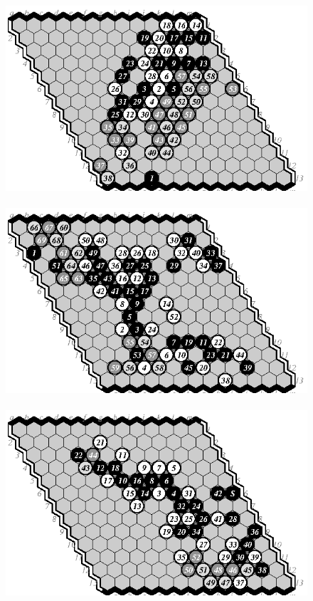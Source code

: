 \documentclass{IOS-Book-Article}
\begin{document}
\begin{figure}
\noindent\hspace*{-2cm}\
\includegraphics[scale=.9]{pix/13.em4plus.eps}\hspace*{-1.8cm}\
\includegraphics[scale=.9]{pix/13.me5plus.eps}\hspace*{-1.8cm}\
\includegraphics[scale=.9]{pix/13.em6plus.eps}\
\smallskip


\end{figure}
\end{document}
